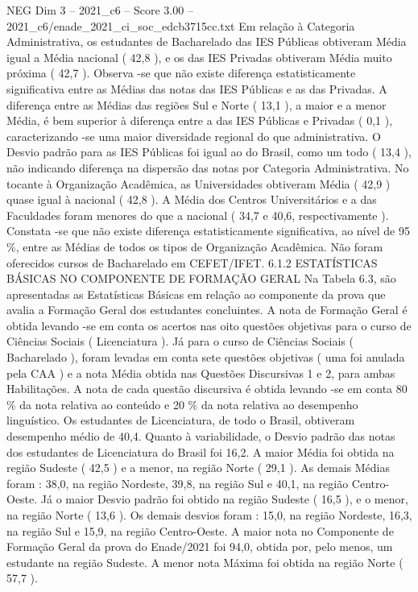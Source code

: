 \begin{textsample}{NEG Dim 3 – 2021\_c6 – Score 3.00 – 2021\_c6/enade\_2021\_ci\_soc\_edcb3715cc.txt}
Em relação à Categoria Administrativa, os estudantes de Bacharelado das IES Públicas obtiveram Média igual a Média nacional ( 42,8 ), e os das IES Privadas obtiveram Média muito próxima ( 42,7 ).
Observa -se que não existe diferença estatisticamente significativa entre as Médias das notas das IES Públicas e as das Privadas.
A diferença entre as Médias das regiões Sul e Norte ( 13,1 ), a maior e a menor Média, é bem superior à diferença entre a das IES Públicas e Privadas ( 0,1 ), caracterizando -se uma maior diversidade regional do que administrativa.
O Desvio padrão para as IES Públicas foi igual ao do Brasil, como um todo ( 13,4 ), não indicando diferença na dispersão das notas por Categoria Administrativa.
No tocante à Organização Acadêmica, as Universidades obtiveram Média ( 42,9 ) quase igual à nacional ( 42,8 ).
A Média dos Centros Universitários e a das Faculdades foram menores do que a nacional ( 34,7 e 40,6, respectivamente ).
Constata -se que não existe diferença estatisticamente significativa, ao nível de 95 \%, entre as Médias de todos os tipos de Organização Acadêmica.
Não foram oferecidos cursos de Bacharelado em CEFET/IFET. 6.1.2 ESTATÍSTICAS BÁSICAS NO COMPONENTE DE FORMAÇÃO GERAL Na Tabela 6.3, são apresentadas as Estatísticas Básicas em relação ao componente da prova que avalia a Formação Geral dos estudantes concluintes.
A nota de Formação Geral é obtida levando -se em conta os acertos nas oito questões objetivas para o curso de Ciências Sociais ( Licenciatura ).
Já para o curso de Ciências Sociais ( Bacharelado ), foram levadas em conta sete questões objetivas ( uma foi anulada pela CAA ) e a nota Média obtida nas Questões Discursivas 1 e 2, para ambas Habilitações.
A nota de cada questão discursiva é obtida levando -se em conta 80 \% da nota relativa ao conteúdo e 20 \% da nota relativa ao desempenho linguístico.
Os estudantes de Licenciatura, de todo o Brasil, obtiveram desempenho médio de 40,4.
Quanto à variabilidade, o Desvio padrão das notas dos estudantes de Licenciatura do Brasil foi 16,2.
A maior Média foi obtida na região Sudeste ( 42,5 ) e a menor, na região Norte ( 29,1 ).
As demais Médias foram : 38,0, na região Nordeste, 39,8, na região Sul e 40,1, na região Centro-Oeste.
Já o maior Desvio padrão foi obtido na região Sudeste ( 16,5 ), e o menor, na região Norte ( 13,6 ).
Os demais desvios foram : 15,0, na região Nordeste, 16,3, na região Sul e 15,9, na região Centro-Oeste.
A maior nota no Componente de Formação Geral da prova do Enade/2021 foi 94,0, obtida por, pelo menos, um estudante na região Sudeste.
A menor nota Máxima foi obtida na região Norte ( 57,7 ).

\end{textsample}
